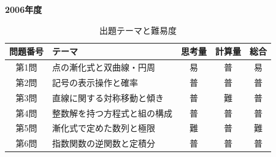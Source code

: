 \documentclass[../../main.tex]{subfiles}
\begin{document}
\begin{center}
  {\fontsize{48pt}{58pt}\selectfont \textbf{2006}\normalsize\textbf{年度}}
\end{center}

\begin{table}[htb]
  \centering
  \caption{出題テーマと難易度}
  \begin{tabular}{|c|p{6.2cm}|c|c|c|}
    \hline
    \textbf{問題番号} & \textbf{テーマ} & \textbf{思考量} & \textbf{計算量} & \textbf{総合} \\
    \hline
    第1問 & 点の漸化式と双曲線・円周 & 易 & 普 & 易 \\
    \hline
    第2問 & 記号の表示操作と確率 & 普 & 普 & 普 \\
    \hline
    第3問 & 直線に関する対称移動と傾き & 普 & 難 & 普 \\
    \hline
    第4問 & 整数解を持つ方程式と組の構成 & 普 & 普 & 普 \\
    \hline
    第5問 & 漸化式で定めた数列と極限 & 難 & 普 & 難 \\
    \hline
    第6問 & 指数関数の逆関数と定積分 & 普 & 普 & 普 \\
    \hline
  \end{tabular}
\end{table}
\end{document}

